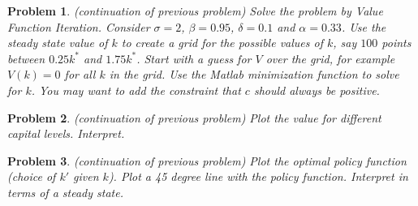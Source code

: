 \documentclass[12pt, a4paper]{article}
\newtheorem{problem}{Problem}
\begin{document}
\begin{problem}
(continuation of previous problem)
Solve the problem by Value Function Iteration.
Consider \(\sigma=2\), \(\beta=0.95\), \(\delta=0.1\) and \(\alpha=0.33\).
Use the steady state value of \(k\) to create a grid for the possible values of \(k\), say \(100\) points between \(0.25 k^*\) and \(1.75 k^*\).
Start with a guess for \(V\) over the grid, for example \(V(k)=0\) for all \(k\) in the grid.
Use the Matlab minimization function to solve for \(k\).
You may want to add the constraint that \(c\) should always be positive.
\end{problem}

\begin{problem}
(continuation of previous problem)
Plot the value for different capital levels. Interpret.
\end{problem}

\begin{problem}
(continuation of previous problem)
Plot the optimal policy function (choice of \(k'\) given \(k\)).
Plot a 45 degree line with the policy function.
Interpret in terms of a steady state.
\end{problem}
\newpage
\printbibliography
\newpage
\end{document}
